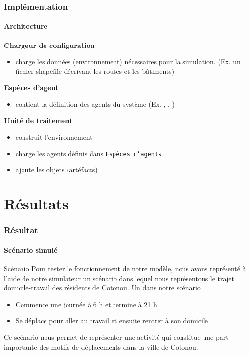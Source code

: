 \begin{frame}
    \frametitle{Implémentation}
    \framesubtitle{Architecture}
    \textbf{Chargeur de configuration}
    \begin{itemize}
        \item charge les données (environnement) nécessaires pour la simulation. (Ex. un fichier shapefile décrivant les routes et les bâtiments)

    \end{itemize}

    \textbf{Espèces d'agent}
    \begin{itemize}
        \item contient la définition des agents du système (Ex. \aTMoto{}, \aTBus{}, \aPolicier{})
    \end{itemize}

    \textbf{Unité de traitement}
    \begin{itemize}
        \item construit l'environnement
        \item charge les agents définis dans \texttt{Espèces d'agents}
        \item ajoute les objets (artéfacts)
    \end{itemize}

\end{frame}


\section{Résultats}\label{results}
\begin{frame}
    \frametitle{Résultat}
    \framesubtitle{Scénario simulé}

    \begin{block}{Scénario}
        Pour tester le fonctionnement de notre modèle, nous avons représenté à l'aide de notre simulateur un scénario dans lequel nous représentons le trajet domicile-travail des résidents de Cotonou.
        Un \aConducteur{} dans notre scénario
        \begin{itemize}
            \item Commence une journée à 6 h et termine à 21 h
            \item Se déplace pour aller au travail et ensuite rentrer à son domicile
        \end{itemize}
        Ce scénario nous permet de représenter une activité qui constitue une part importante des motifs de déplacements dans la ville de Cotonou.
    \end{block}

\end{frame}

